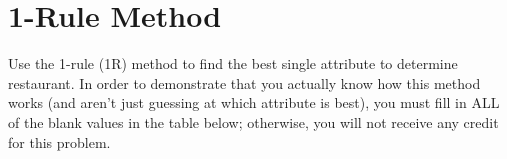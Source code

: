 \documentclass[12pt]{scrartcl}
\begin{document}
\maketitle

\section{1-Rule Method}
\begin{statement}
    Use the 1-rule (1R) method to find the best single attribute to determine restaurant. In order to demonstrate that you actually know how this method works (and aren’t just guessing at which attribute is best), you must fill in ALL of the blank values in the table below; otherwise, you will not receive any credit for this problem.
\end{statement}

\begin{table}[H]
    \centering
\end{table}
\end{document}

